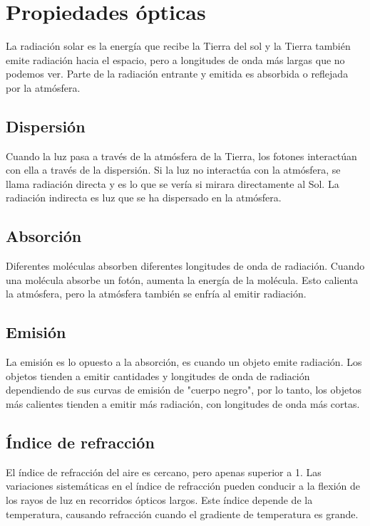 \documentclass{article}
\begin{document}
\section{Propiedades ópticas}

La radiación solar es la energía que recibe la Tierra del sol y la Tierra también emite radiación hacia el espacio, pero a longitudes de onda más largas que no podemos ver. Parte de la radiación entrante y emitida es absorbida o reflejada por la atmósfera. 

\subsection{Dispersión}

Cuando la luz pasa a través de la atmósfera de la Tierra, los fotones interactúan con ella a través de la dispersión. Si la luz no interactúa con la atmósfera, se llama radiación directa y es lo que se vería si mirara directamente al Sol. La radiación indirecta es luz que se ha dispersado en la atmósfera.

\subsection{Absorción}

Diferentes moléculas absorben diferentes longitudes de onda de radiación. Cuando una molécula absorbe un fotón, aumenta la energía de la molécula. Esto calienta la atmósfera, pero la atmósfera también se enfría al emitir radiación. 

\subsection{Emisión}

La emisión es lo opuesto a la absorción, es cuando un objeto emite radiación. Los objetos tienden a emitir cantidades y longitudes de onda de radiación dependiendo de sus curvas de emisión de "cuerpo negro", por lo tanto, los objetos más calientes tienden a emitir más radiación, con longitudes de onda más cortas. 


\subsection{Índice de refracción}

El índice de refracción del aire es cercano, pero apenas superior a 1. Las variaciones sistemáticas en el índice de refracción pueden conducir a la flexión de los rayos de luz en recorridos ópticos largos. Este índice depende de la temperatura, causando refracción cuando el gradiente de temperatura es grande.
\end{document}
